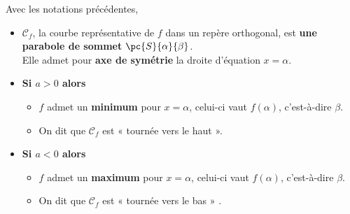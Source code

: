 \documentclass[a4paper,11pt,cours]{nsi}
\begin{document}
\begin{propriete}[\ 2]
	Avec les notations précédentes,
	
	\begin{itemize}
		\item 	$\mathcal{C}_f$, la courbe représentative de $f$ dans un repère orthogonal, est \textbf{une parabole de sommet}
		{\boldmath $\pc{S}{\alpha}{\beta}$}.\\
		Elle admet pour \textbf{axe de symétrie} la droite d'équation {\boldmath $x=\alpha$}.
		\item 	\textbf{Si {\boldmath $a>0$} alors}
		\begin{itemize}
			\item 	$f$ admet un \textbf{minimum} pour $x=\alpha$, celui-ci vaut $f(\alpha)$, c'est-à-dire $\beta$.
			\item 	On dit que $\mathcal{C}_f$ est « tournée vers le haut ».
		\end{itemize}
		\item 	\textbf{Si {\boldmath $a<0$} alors}
		\begin{itemize}
			\item 	$f$ admet un \textbf{maximum} pour $x=\alpha$, celui-ci vaut $f(\alpha)$, c'est-à-dire $\beta$.
			\item 	On dit que $\mathcal{C}_f$ est « tournée vers le bas » .\\
		\end{itemize}
	\end{itemize}
\end{propriete}
\end{document}
